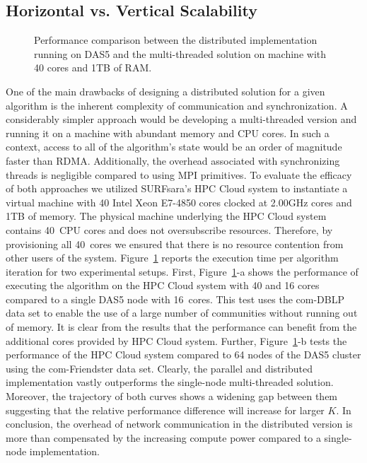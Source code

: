 \subsection{Horizontal vs. Vertical Scalability}
\begin{figure}[b] %
  \centering
  \caption{Performance comparison between the distributed implementation
  running on DAS5 and the multi-threaded solution on machine with 40 cores and
  1TB of RAM.}
  \label{fig-scale-up}
\end{figure}
One of the main drawbacks of designing a distributed solution for a given
algorithm is the inherent complexity of communication and synchronization. A
considerably simpler approach would be developing a multi-threaded version and
running it on a machine with abundant memory and CPU cores. In such a context,
access to all of the algorithm's state would be an order of magnitude faster
than RDMA. Additionally, the overhead associated with synchronizing threads is
negligible compared to using MPI primitives. To evaluate the efficacy of both
approaches we utilized SURFsara's HPC Cloud system to instantiate a virtual
machine with 40 Intel Xeon E7-4850 cores clocked at 2.00GHz cores and 1TB of
memory. The physical machine underlying
the HPC Cloud system contains 40~CPU cores and does not oversubscribe
resources. Therefore, by provisioning all 40~cores we ensured that there is no
resource contention from other users of the system. Figure~\ref{fig-scale-up}
reports the execution time per algorithm iteration for two experimental setups.
%
First, Figure~\ref{fig-scale-up}-a shows the performance of executing the
algorithm on the HPC Cloud
system with 40 and 16 cores compared to a single DAS5 node with 16~cores. This
test uses the com-DBLP data set to enable the use of a large number of
communities without running out of memory. It is clear from the results that
the performance can benefit from the additional cores provided by HPC Cloud system.
%
Further, Figure~\ref{fig-scale-up}-b tests the performance of the HPC Cloud
system compared to 64 nodes of the DAS5
cluster using the com-Friendster data set. Clearly, the parallel and
distributed implementation vastly
outperforms the single-node multi-threaded solution. Moreover, the trajectory
of both curves shows a widening gap between them suggesting that the relative
performance difference will increase for larger $K$.
%
In conclusion, the overhead of network communication in the distributed version
is more than compensated by the increasing compute power compared to
a single-node implementation.

